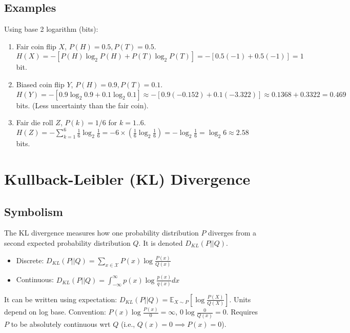 \documentclass{article}
\newcommand{\E}{\mathbb{E}}    %
\begin{document}
\subsection*{Examples}
Using base 2 logarithm (bits):
\begin{enumerate}
    \item Fair coin flip $X$, $P(H)=0.5, P(T)=0.5$.
    $H(X) = - [P(H)\log_2 P(H) + P(T)\log_2 P(T)] = - [0.5(-1) + 0.5(-1)] = 1$ bit.
    \item Biased coin flip $Y$, $P(H)=0.9, P(T)=0.1$.
    $H(Y) = - [0.9 \log_2 0.9 + 0.1 \log_2 0.1] \approx - [0.9(-0.152) + 0.1(-3.322)] \approx 0.1368 + 0.3322 = 0.469$ bits. (Less uncertainty than the fair coin).
    \item Fair die roll $Z$, $P(k)=1/6$ for $k=1..6$.
    $H(Z) = - \sum_{k=1}^6 \frac{1}{6} \log_2 \frac{1}{6} = - 6 \times (\frac{1}{6} \log_2 \frac{1}{6}) = - \log_2 \frac{1}{6} = \log_2 6 \approx 2.58$ bits.
\end{enumerate}

\section{Kullback-Leibler (KL) Divergence}

\subsection*{Symbolism}
The KL divergence measures how one probability distribution $P$ diverges from a second expected probability distribution $Q$. It is denoted $D_{KL}(P || Q)$.
\begin{itemize}
    \item Discrete: $D_{KL}(P || Q) = \sum_{x \in \mathcal{X}} P(x) \log \frac{P(x)}{Q(x)}$
    \item Continuous: $D_{KL}(P || Q) = \int_{-\infty}^{\infty} p(x) \log \frac{p(x)}{q(x)} dx$
\end{itemize}
It can be written using expectation: $D_{KL}(P || Q) = \E_{X \sim P} \left[ \log \frac{P(X)}{Q(X)} \right]$. Units depend on log base. Convention: $P(x) \log \frac{P(x)}{0} = \infty$, $0 \log \frac{0}{Q(x)} = 0$. Requires $P$ to be absolutely continuous wrt $Q$ (i.e., $Q(x)=0 \implies P(x)=0$).
\end{document}
